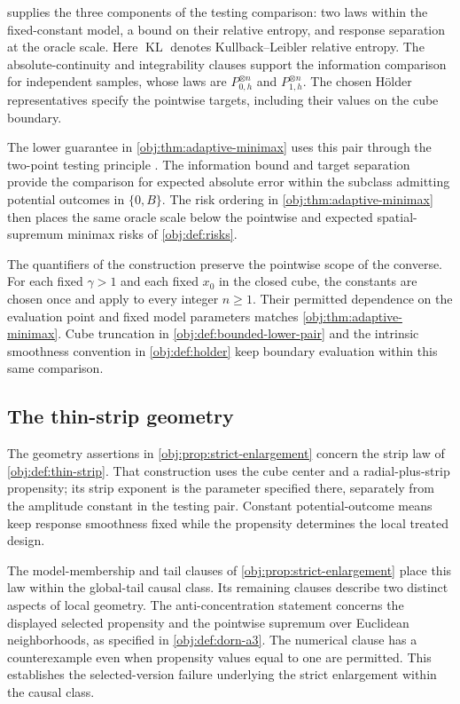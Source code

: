  supplies the three components of the testing comparison: two laws within the fixed-constant model, a bound on their relative entropy, and response separation at the oracle scale. Here \(\operatorname{KL}\) denotes Kullback--Leibler relative entropy. The absolute-continuity and integrability clauses support the information comparison for independent samples, whose laws are \(P_{0,h}^{\otimes n}\) and \(P_{1,h}^{\otimes n}\). The chosen Hölder representatives specify the pointwise targets, including their values on the cube boundary.

The lower guarantee in \cref{obj:thm:adaptive-minimax} uses this pair through the two-point testing principle \citep[Section~2.2]{tsybakov2009}. The information bound and target separation provide the comparison for expected absolute error within the subclass admitting potential outcomes in \(\{0,B\}\). The risk ordering in \cref{obj:thm:adaptive-minimax} then places the same oracle scale below the pointwise and expected spatial-supremum minimax risks of \cref{obj:def:risks}.

The quantifiers of the construction preserve the pointwise scope of the converse. For each fixed \(\gamma>1\) and each fixed \(x_0\) in the closed cube, the constants are chosen once and apply to every integer \(n\ge1\). Their permitted dependence on the evaluation point and fixed model parameters matches \cref{obj:thm:adaptive-minimax}. Cube truncation in \cref{obj:def:bounded-lower-pair} and the intrinsic smoothness convention in \cref{obj:def:holder} keep boundary evaluation within this same comparison.

\subsection{The thin-strip geometry}

The geometry assertions in \cref{obj:prop:strict-enlargement} concern the strip law of \cref{obj:def:thin-strip}. That construction uses the cube center and a radial-plus-strip propensity; its strip exponent is the parameter specified there, separately from the amplitude constant in the testing pair. Constant potential-outcome means keep response smoothness fixed while the propensity determines the local treated design.

The model-membership and tail clauses of \cref{obj:prop:strict-enlargement} place this law within the global-tail causal class. Its remaining clauses describe two distinct aspects of local geometry. The anti-concentration statement concerns the displayed selected propensity and the pointwise supremum over Euclidean neighborhoods, as specified in \cref{obj:def:dorn-a3}. The numerical clause has a counterexample even when propensity values equal to one are permitted. This establishes the selected-version failure underlying the strict enlargement within the causal class.

